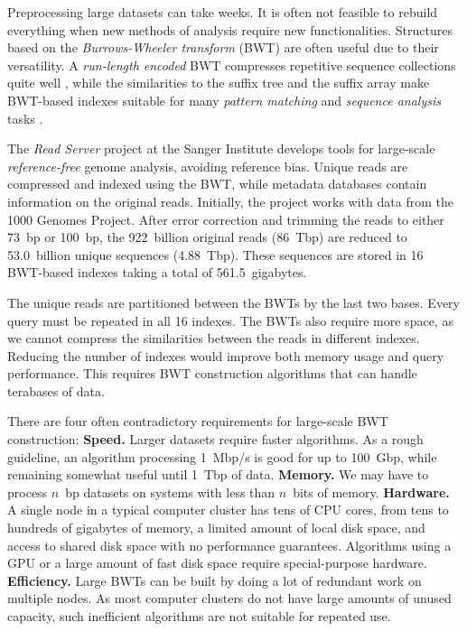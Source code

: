 \documentclass[smallabstract,smallcaptions]{dccpaper}
\newcommand{\BWT}{\textsf{BWT}}
\begin{document}
Preprocessing large datasets can take weeks. It is often not feasible to rebuild everything when new methods of analysis require new functionalities. Structures based on the \emph{Burrows-Wheeler transform} (\BWT) are often useful due to their versatility. A \emph{run-length encoded} \BWT{} compresses repetitive sequence collections quite well \cite{Maekinen2010}, while the similarities to the suffix tree and the suffix array make \BWT-based indexes suitable for many \emph{pattern matching} and \emph{sequence analysis} tasks \cite{Ohlebusch2013,Maekinen2015}.

The \emph{Read Server} project at the Sanger Institute develops tools for large-scale \emph{reference-free} genome analysis, avoiding reference bias. Unique reads are compressed and indexed using the \BWT, while metadata databases contain information on the original reads. Initially, the project works with
data from the 1000 Genomes Project.
After error correction and trimming the reads to either 73~bp or 100~bp, the 922~billion original reads (86~Tbp) are reduced to 53.0~billion unique sequences (4.88~Tbp). These sequences are stored in 16 \BWT-based indexes \cite{Ferragina2005a} taking a total of 561.5~gigabytes.

The unique reads are partitioned between the \BWT{}s by the last two bases. Every query must be repeated in all 16 indexes. The \BWT{}s also require more space, as we cannot compress the similarities between the reads in different indexes. Reducing the number of indexes would improve both memory usage and query performance. This requires \BWT{} construction algorithms that can handle terabases of data.

There are four often contradictory requirements for large-scale \BWT{} construction:
\textbf{Speed.} Larger datasets require faster algorithms. As a rough guideline, an algorithm processing 1~Mbp/s is good for up to 100~Gbp, while remaining somewhat useful until 1~Tbp of data.
\textbf{Memory.} We may have to process $n$~bp datasets on systems with less than $n$~bits of memory.
\textbf{Hardware.} A single node in a typical computer cluster has tens of CPU cores, from tens to hundreds of gigabytes of memory, a limited amount of local disk space, and access to shared disk space with no performance guarantees. Algorithms using a GPU or a large amount of fast disk space require special-purpose hardware.
\textbf{Efficiency.} Large \BWT{}s can be built by doing a lot of redundant work on multiple nodes. As most computer clusters do not have large amounts of unused capacity, such inefficient algorithms are not suitable for repeated use.
\end{document}
